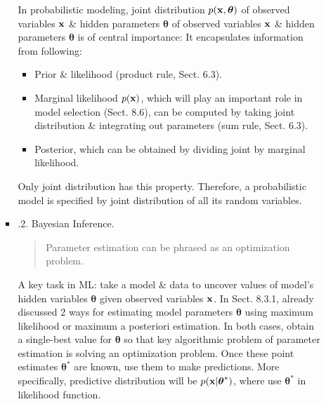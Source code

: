 \documentclass{article}
\begin{document}
\begin{itemize}
\begin{itemize}
\begin{itemize}
			In probabilistic modeling, joint distribution $p({\bf x},\boldsymbol{\theta})$ of observed variables ${\bf x}$ \& hidden parameters $\boldsymbol{\theta}$ of observed variables ${\bf x}$ \& hidden parameters $\boldsymbol{\theta}$ is of central importance: It encapsulates information from following:
			\begin{itemize}
				\item Prior \& likelihood (product rule, Sect. 6.3).
				\item Marginal likelihood $p({\bf x})$, which will play an important role in model selection (Sect. 8.6), can be computed by taking joint distribution \& integrating out parameters (sum rule, Sect. 6.3).
				\item Posterior, which can be obtained by dividing joint by marginal likelihood.
			\end{itemize}
			Only joint distribution has this property. Therefore, a probabilistic model is specified by joint distribution of all its random variables.
			\item {.2. Bayesian Inference.}
			\begin{quote}
				Parameter estimation can be phrased as an optimization problem.
			\end{quote}
			A key task in ML: take a model \& data to uncover values of model's hidden variables $\boldsymbol{\theta}$ given observed variables ${\bf x}$. In Sect. 8.3.1, already discussed 2 ways for estimating model parameters $\boldsymbol{\theta}$ using maximum likelihood or maximum a posteriori estimation. In both cases, obtain a single-best value for $\boldsymbol{\theta}$ so that key algorithmic problem of parameter estimation is solving an optimization problem. Once these point estimates $\boldsymbol{\theta}^*$ are known, use them to make predictions. More specifically, predictive distribution will be $p({\bf x}|\boldsymbol{\theta}^*)$, where use $\boldsymbol{\theta}^*$ in likelihood function.
			

\end{itemize}
\end{itemize}
\end{itemize}
\end{document}
